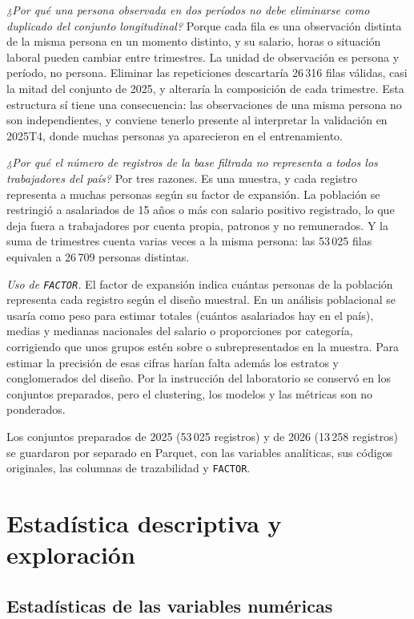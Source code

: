 \documentclass[11pt,a4paper]{article}
\newcommand{\var}[1]{\texttt{#1}}
\begin{document}
\textit{¿Por qué una persona observada en dos períodos no debe eliminarse como duplicado del conjunto longitudinal?} Porque cada fila es una observación distinta de la misma persona en un momento distinto, y su salario, horas o situación laboral pueden cambiar entre trimestres. La unidad de observación es persona y período, no persona. Eliminar las repeticiones descartaría 26\,316 filas válidas, casi la mitad del conjunto de 2025, y alteraría la composición de cada trimestre. Esta estructura sí tiene una consecuencia: las observaciones de una misma persona no son independientes, y conviene tenerlo presente al interpretar la validación en 2025T4, donde muchas personas ya aparecieron en el entrenamiento.

\textit{¿Por qué el número de registros de la base filtrada no representa a todos los trabajadores del país?} Por tres razones. Es una muestra, y cada registro representa a muchas personas según su factor de expansión. La población se restringió a asalariados de 15 años o más con salario positivo registrado, lo que deja fuera a trabajadores por cuenta propia, patronos y no remunerados. Y la suma de trimestres cuenta varias veces a la misma persona: las 53\,025 filas equivalen a 26\,709 personas distintas.

\textit{Uso de \var{FACTOR}.} El factor de expansión indica cuántas personas de la población representa cada registro según el diseño muestral. En un análisis poblacional se usaría como peso para estimar totales (cuántos asalariados hay en el país), medias y medianas nacionales del salario o proporciones por categoría, corrigiendo que unos grupos estén sobre o subrepresentados en la muestra. Para estimar la precisión de esas cifras harían falta además los estratos y conglomerados del diseño. Por la instrucción del laboratorio se conservó en los conjuntos preparados, pero el clustering, los modelos y las métricas son no ponderados.

Los conjuntos preparados de 2025 (53\,025 registros) y de 2026 (13\,258 registros) se guardaron por separado en Parquet, con las variables analíticas, sus códigos originales, las columnas de trazabilidad y \var{FACTOR}.

\section{Estadística descriptiva y exploración}

\subsection{Estadísticas de las variables numéricas}
\end{document}
